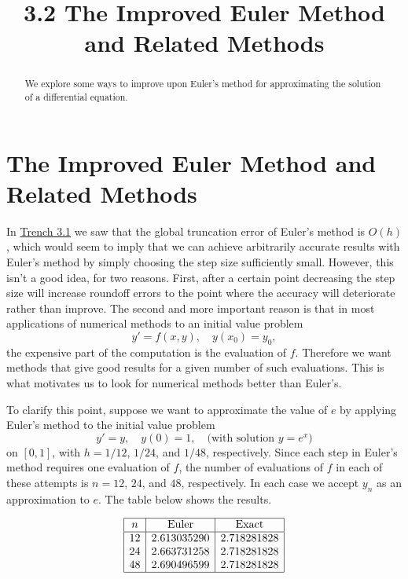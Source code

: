 \documentclass{ximera}
\title{3.2 The Improved Euler Method and Related Methods}%
\begin{document}
\begin{abstract}
We explore some ways to improve upon Euler's method for approximating the solution of a differential equation.
\end{abstract}

\maketitle

\section*{The Improved Euler Method and Related Methods}

In \href{https://ximera.osu.edu/ode/main/eulersMethod/eulersMethod}{Trench 3.1} we saw that the global truncation error of
Euler's method is $O(h)$, which would seem to imply that we can
achieve arbitrarily accurate results with Euler's method by simply
choosing the step size sufficiently small. However, this
isn't  a good idea, for two reasons. First,
after a certain point decreasing the step size will
increase roundoff errors to the point where the accuracy
will deteriorate rather than improve.
 The second
and more important reason is that in most applications of numerical
methods to an initial value problem
\begin{equation} \label{eq:3.2.1}
y'=f(x,y),\quad y(x_0)=y_0,
\end{equation}
the expensive part of the computation is the evaluation of $f$.
Therefore we want methods that give good results for a given number
of such evaluations. This is what motivates us to look for numerical
methods better than Euler's.

To clarify this point, suppose  we want to approximate the value of $e$
by applying Euler's method to the initial value problem
$$
y'=y,\quad y(0)=1,\quad\mbox{(with solution $y=e^x$)}
$$
on $[0,1]$, with $h=1/12$, $1/24$, and $1/48$, respectively. Since
each step in Euler's method requires one evaluation of $f$, the number
of evaluations of $f$ in each of these attempts is $n=12$, $24$, and
$48$, respectively. In each case we accept $y_n$ as an approximation
to $e$.  The table below shows the results. 

\begin{center}
$$
\begin{array}{|c|c|c|}
\hline
n&
\text{Euler}&

\text{Exact}\\ \hline
12 & 2.613035290  & 2.718281828 \\
24 & 2.663731258   & 2.718281828 \\
48 & 2.690496599  & 2.718281828
\\
\hline
\end{array}
$$
\end{center}
\end{document}
